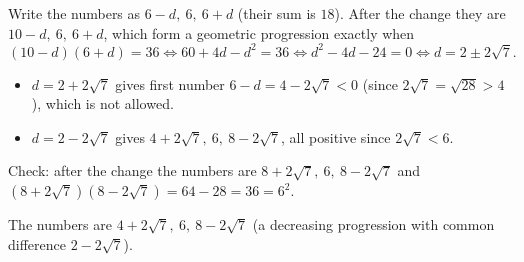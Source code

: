 Write the numbers as $6-d,\ 6,\ 6+d$ (their sum is $18$). After the change they are $10-d,\ 6,\ 6+d$, which form a geometric progression exactly when
\[
(10-d)(6+d)=36\iff 60+4d-d^2=36\iff d^2-4d-24=0\iff d=2\pm2\sqrt7 .
\]
\begin{itemize}
\item $d=2+2\sqrt7$ gives first number $6-d=4-2\sqrt7<0$ (since $2\sqrt7=\sqrt{28}>4$), which is not allowed.
\item $d=2-2\sqrt7$ gives $4+2\sqrt7,\ 6,\ 8-2\sqrt7$, all positive since $2\sqrt7<6$.
\end{itemize}
Check: after the change the numbers are $8+2\sqrt7,\ 6,\ 8-2\sqrt7$ and $(8+2\sqrt7)(8-2\sqrt7)=64-28=36=6^2$.

The numbers are $\boxed{4+2\sqrt7,\ 6,\ 8-2\sqrt7}$ (a decreasing progression with common difference $2-2\sqrt7$).
